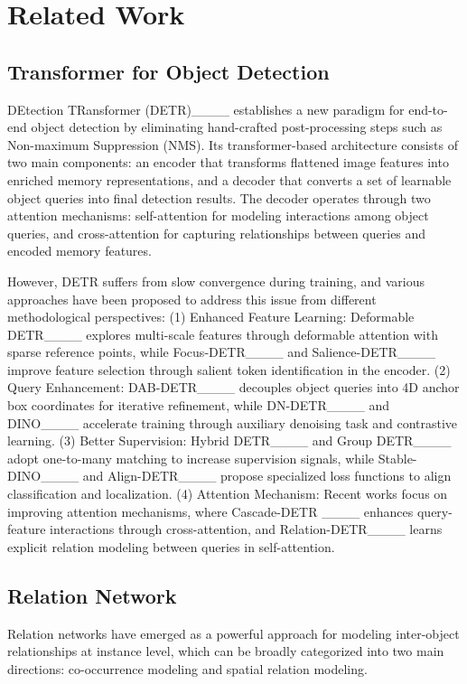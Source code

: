 \section{Related Work}
\label{sec:related-work}

\subsection{Transformer for Object Detection}
\label{sec:transformer-object-detection}
DEtection TRansformer (DETR)____ establishes a new paradigm for end-to-end object detection by eliminating hand-crafted post-processing steps such as Non-maximum Suppression (NMS). Its transformer-based architecture consists of two main components: an encoder that transforms flattened image features into enriched memory representations, and a decoder that converts a set of learnable object queries into final detection results. The decoder operates through two attention mechanisms: self-attention for modeling interactions among object queries, and cross-attention for capturing relationships between queries and encoded memory features.

However, DETR suffers from slow convergence during training, and various approaches have been proposed to address this issue from different methodological perspectives: (1) Enhanced Feature Learning: Deformable DETR____ explores multi-scale features through deformable attention with sparse reference points, while Focus-DETR____ and Salience-DETR____ improve feature selection through salient token identification in the encoder. (2) Query Enhancement: DAB-DETR____ decouples object queries into 4D anchor box coordinates for iterative refinement, while DN-DETR____ and DINO____ accelerate training through auxiliary denoising task and contrastive learning. (3) Better Supervision: Hybrid DETR____ and Group DETR____ adopt one-to-many matching to increase supervision signals, while Stable-DINO____ and Align-DETR____ propose specialized loss functions to align classification and localization. (4) Attention Mechanism: Recent works focus on improving attention mechanisms, where Cascade-DETR ____ enhances query-feature interactions through cross-attention, and Relation-DETR____ learns explicit relation modeling between queries in self-attention.

\subsection{Relation Network}
\label{sec:relation-network}
Relation networks have emerged as a powerful approach for modeling inter-object relationships at instance level, which can be broadly categorized into two main directions: co-occurrence modeling and spatial relation modeling.

